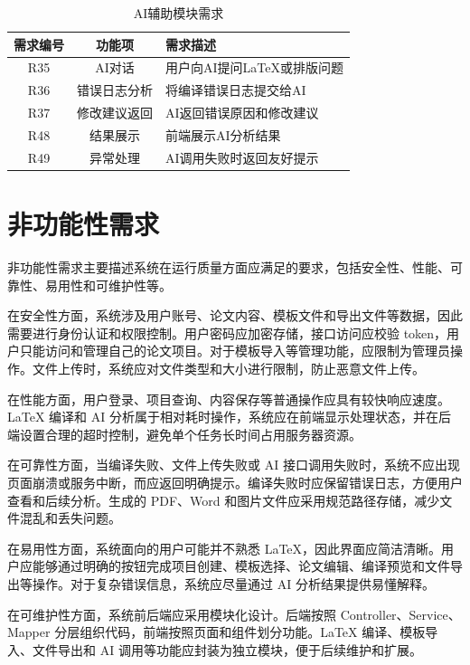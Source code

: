 \documentclass{xduugthesis}
\begin{document}
\begin{table}[H]
    \centering
    \caption{AI辅助模块需求}
    \label{tab:ai-requirement}
    \begin{tabular}{|c|c|p{7cm}|}
        \hline
        需求编号 & 功能项 & 需求描述 \\
        \hline
        R35 & AI对话 & 用户向AI提问LaTeX或排版问题 \\
        \hline
        R36 & 错误日志分析 & 将编译错误日志提交给AI \\
        \hline
        R37 & 修改建议返回 & AI返回错误原因和修改建议 \\
        \hline
        R48 & 结果展示 & 前端展示AI分析结果 \\
        \hline
        R49 & 异常处理 & AI调用失败时返回友好提示 \\
        \hline
    \end{tabular}
\end{table}

\section{非功能性需求}
非功能性需求主要描述系统在运行质量方面应满足的要求，包括安全性、性能、可靠性、易用性和可维护性等。

在安全性方面，系统涉及用户账号、论文内容、模板文件和导出文件等数据，因此需要进行身份认证和权限控制。用户密码应加密存储，接口访问应校验 token，用户只能访问和管理自己的论文项目。对于模板导入等管理功能，应限制为管理员操作。文件上传时，系统应对文件类型和大小进行限制，防止恶意文件上传。

在性能方面，用户登录、项目查询、内容保存等普通操作应具有较快响应速度。LaTeX 编译和 AI 分析属于相对耗时操作，系统应在前端显示处理状态，并在后端设置合理的超时控制，避免单个任务长时间占用服务器资源。

在可靠性方面，当编译失败、文件上传失败或 AI 接口调用失败时，系统不应出现页面崩溃或服务中断，而应返回明确提示。编译失败时应保留错误日志，方便用户查看和后续分析。生成的 PDF、Word 和图片文件应采用规范路径存储，减少文件混乱和丢失问题。

在易用性方面，系统面向的用户可能并不熟悉 LaTeX，因此界面应简洁清晰。用户应能够通过明确的按钮完成项目创建、模板选择、论文编辑、编译预览和文件导出等操作。对于复杂错误信息，系统应尽量通过 AI 分析结果提供易懂解释。

在可维护性方面，系统前后端应采用模块化设计。后端按照 Controller、Service、Mapper 分层组织代码，前端按照页面和组件划分功能。LaTeX 编译、模板导入、文件导出和 AI 调用等功能应封装为独立模块，便于后续维护和扩展。
\end{document}
